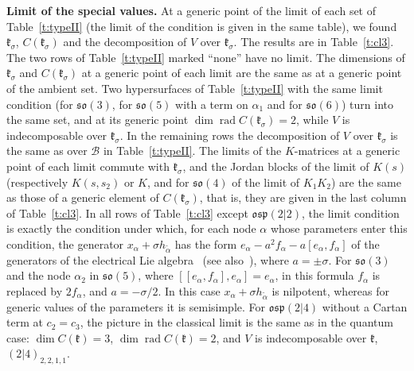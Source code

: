 \documentclass[12pt,a4paper]{article}
\newcommand{\kk}{\mathfrak{k}}
\newcommand{\so}{\mathfrak{so}}
\newcommand{\osp}{\mathfrak{osp}}
\newcommand{\ta}{\tilde\alpha}
\begin{document}
\textbf{Limit of the special values.} At a generic point of the limit of each set of Table~\ref{t:typeII} (the limit of the condition
is given in the same table), we found $\kk_\sigma$, $C(\kk_\sigma)$ and the decomposition of $V$ over $\kk_\sigma$. The results are in
Table~\ref{t:cl3}. The two rows of Table~\ref{t:typeII} marked ``none'' have no limit. The dimensions of
$\kk_\sigma$ and $C(\kk_\sigma)$ at a generic point of each limit are the same as at a generic point of the ambient set. Two
hypersurfaces of Table~\ref{t:typeII} with the same limit condition (for $\so(3)$, for $\so(5)$ with a term
on $\alpha_1$ and for $\so(6)$) turn into the same set, and at its generic point $\dim\operatorname{rad}C(\kk_\sigma)=2$,
while $V$ is indecomposable over $\kk_\sigma$. In the remaining rows the decomposition of $V$ over $\kk_\sigma$ is the same as over $\mathcal B$ in Table~\ref{t:typeII}.
The limits of the $K$-matrices at a generic point of each limit commute with $\kk_\sigma$, and the Jordan blocks of the limit of $K(s)$ (respectively
$K(s,s_2)$ or $K$, and for $\so(4)$ of the limit of $K_1K_2$) are the same as those of a generic element of $C(\kk_\sigma)$, that is, they are given
in the last column of Table~\ref{t:cl3}. In all rows of Table~\ref{t:cl3} except $\osp(2|2)$, the limit
condition is exactly the condition under which, for each node $\alpha$ whose parameters enter this condition,
the generator $x_\alpha+\sigma h_{\ta}$ has the form $e_\alpha-a^2f_\alpha-a[e_\alpha,f_\alpha]$ of the generators of the electrical
Lie algebra~\cite[Section~3.1]{AMS2} (see also~\cite{LP,BGG}), where $a=\pm\sigma$. For $\so(3)$ and the node $\alpha_2$ in $\so(5)$, where
$[[e_\alpha,f_\alpha],e_\alpha]=e_\alpha$, in this formula $f_\alpha$ is replaced by $2f_\alpha$, and $a=-\sigma/2$. In this case
$x_\alpha+\sigma h_{\ta}$ is nilpotent, whereas for generic values of the parameters it is semisimple.
For $\osp(2|4)$ without a Cartan term at $c_2=c_3$, the picture in the classical limit
is the same as in the quantum case: $\dim C(\kk)=3$, $\dim\operatorname{rad}C(\kk)=2$, and $V$ is indecomposable over $\kk$,
$(2|4)_{2,2,1,1}$.
\end{document}
